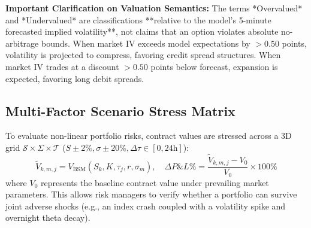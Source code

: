 \noindent
\textbf{Important Clarification on Valuation Semantics:}
The terms *Overvalued* and *Undervalued* are classifications **relative to the model's 5-minute forecasted implied volatility**, not claims that an option violates absolute no-arbitrage bounds. When market IV exceeds model expectations by $> 0.50$ points, volatility is projected to compress, favoring credit spread structures. When market IV trades at a discount $> 0.50$ points below forecast, expansion is expected, favoring long debit spreads.

\subsection{Multi-Factor Scenario Stress Matrix}
\label{sec:scenario_simulation_math}

To evaluate non-linear portfolio risks, contract values are stressed across a 3D grid $\mathcal{S} \times \Sigma \times \mathcal{T}$ ($S \pm 2\%, \sigma \pm 20\%, \Delta\tau \in [0, 24\text{h}]$):
\begin{equation}
    \widetilde{V}_{k, m, j} = V_{\text{BSM}}(S_k, K, \tau_j, r, \sigma_m), \quad \Delta P\&L\% = \frac{\widetilde{V}_{k, m, j} - V_0}{V_0} \times 100\%
\end{equation}
where $V_0$ represents the baseline contract value under prevailing market parameters. This allows risk managers to verify whether a portfolio can survive joint adverse shocks (e.g., an index crash coupled with a volatility spike and overnight theta decay).
